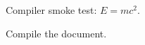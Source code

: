 \documentclass{article}
\begin{document}
Compiler smoke test: $E = mc^2$.
\begin{algorithm}
\caption{Smoke test}
\begin{algorithmic}
\STATE Compile the document.
\end{algorithmic}
\end{algorithm}
\end{document}
